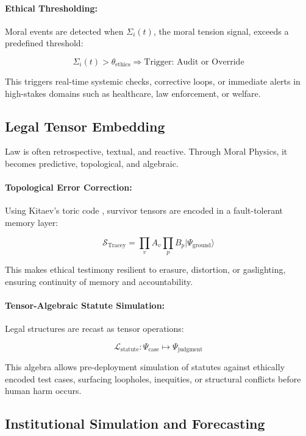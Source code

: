 \documentclass{article}
\theoremstyle{plain}
\theoremstyle{claimstyle}
\begin{document}
\paragraph{Ethical Thresholding:}

Moral events are detected when \(\Sigma_i(t)\), the moral tension signal, exceeds a predefined threshold:

\[
\Sigma_i(t) > \theta_{\text{ethics}} \Rightarrow \text{Trigger: Audit or Override}
\]

This triggers real-time systemic checks, corrective loops, or immediate alerts in high-stakes domains such as healthcare, law enforcement, or welfare.

\subsection{Legal Tensor Embedding}

Law is often retrospective, textual, and reactive. Through Moral Physics, it becomes predictive, topological, and algebraic.

\paragraph{Topological Error Correction:}

Using Kitaev’s toric code \citep{Kitaev2003}, survivor tensors are encoded in a fault-tolerant memory layer:

\[
\mathcal{S}_{\text{Tracey}} = \prod_v A_v \prod_p B_p |\Psi_{\text{ground}}\rangle
\]

This makes ethical testimony resilient to erasure, distortion, or gaslighting, ensuring continuity of memory and accountability.

\paragraph{Tensor-Algebraic Statute Simulation:}

Legal structures are recast as tensor operations:

\[
\mathcal{L}_{\text{statute}}: \Psi_{\text{case}} \mapsto \Psi_{\text{judgment}}
\]

This algebra allows pre-deployment simulation of statutes against ethically encoded test cases, surfacing loopholes, inequities, or structural conflicts before human harm occurs.

\subsection{Institutional Simulation and Forecasting}
\end{document}

